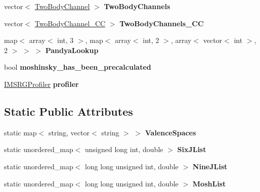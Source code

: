 \begin{DoxyCompactItemize}
\item 
vector$<$ \hyperlink{classTwoBodyChannel}{Two\+Body\+Channel} $>$ {\bfseries Two\+Body\+Channels}\hypertarget{classModelSpace_abf47bbec623fcfd063d45451581fde38}{}\label{classModelSpace_abf47bbec623fcfd063d45451581fde38}

\item 
vector$<$ \hyperlink{classTwoBodyChannel__CC}{Two\+Body\+Channel\+\_\+\+CC} $>$ {\bfseries Two\+Body\+Channels\+\_\+\+CC}\hypertarget{classModelSpace_a17dcaa8731272e28762d8b785d8786b2}{}\label{classModelSpace_a17dcaa8731272e28762d8b785d8786b2}

\item 
map$<$ array$<$ int, 3 $>$, map$<$ array$<$ int, 2 $>$, array$<$ vector$<$ int $>$, 2 $>$ $>$ $>$ {\bfseries Pandya\+Lookup}\hypertarget{classModelSpace_a386a977fced025398b2531f6ce5d7cc3}{}\label{classModelSpace_a386a977fced025398b2531f6ce5d7cc3}

\item 
bool {\bfseries moshinsky\+\_\+has\+\_\+been\+\_\+precalculated}\hypertarget{classModelSpace_a4efe26f443e19138189e8934c7eda80c}{}\label{classModelSpace_a4efe26f443e19138189e8934c7eda80c}

\item 
\hyperlink{classIMSRGProfiler}{I\+M\+S\+R\+G\+Profiler} {\bfseries profiler}\hypertarget{classModelSpace_a9d5b193fe45f361371beb818bfe00fd3}{}\label{classModelSpace_a9d5b193fe45f361371beb818bfe00fd3}

\end{DoxyCompactItemize}
\subsection*{Static Public Attributes}
\begin{DoxyCompactItemize}
\item 
static map$<$ string, vector$<$ string $>$ $>$ {\bfseries Valence\+Spaces}
\item 
static unordered\+\_\+map$<$ unsigned long int, double $>$ {\bfseries Six\+J\+List}\hypertarget{classModelSpace_ad9d8883d388c97409486e485a8ec3427}{}\label{classModelSpace_ad9d8883d388c97409486e485a8ec3427}

\item 
static unordered\+\_\+map$<$ long long unsigned int, double $>$ {\bfseries Nine\+J\+List}\hypertarget{classModelSpace_a52b74b8a95b04440b2e83003078d1d04}{}\label{classModelSpace_a52b74b8a95b04440b2e83003078d1d04}

\item 
static unordered\+\_\+map$<$ long long unsigned int, double $>$ {\bfseries Mosh\+List}\hypertarget{classModelSpace_af2277f24420fc09ac382216a1bf38121}{}\label{classModelSpace_af2277f24420fc09ac382216a1bf38121}

\end{DoxyCompactItemize}


